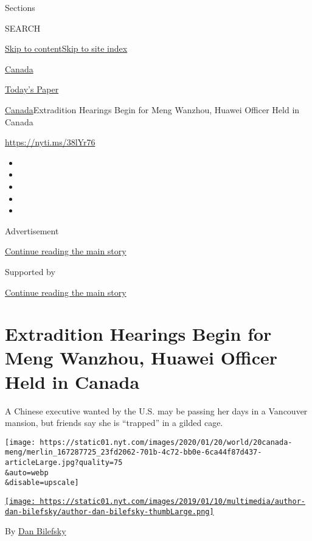 Sections

SEARCH

\protect\hyperlink{site-content}{Skip to
content}\protect\hyperlink{site-index}{Skip to site index}

\href{https://www.nytimes.com/section/world/canada}{Canada}

\href{https://myaccount.nytimes.com/auth/login?response_type=cookie\&client_id=vi}{}

\href{https://www.nytimes.com/section/todayspaper}{Today's Paper}

\href{/section/world/canada}{Canada}\textbar{}Extradition Hearings Begin
for Meng Wanzhou, Huawei Officer Held in Canada

\url{https://nyti.ms/38lYr76}

\begin{itemize}
\item
\item
\item
\item
\item
\end{itemize}

Advertisement

\protect\hyperlink{after-top}{Continue reading the main story}

Supported by

\protect\hyperlink{after-sponsor}{Continue reading the main story}

\hypertarget{extradition-hearings-begin-for-meng-wanzhou-huawei-officer-held-in-canada}{%
\section{Extradition Hearings Begin for Meng Wanzhou, Huawei Officer
Held in
Canada}\label{extradition-hearings-begin-for-meng-wanzhou-huawei-officer-held-in-canada}}

A Chinese executive wanted by the U.S. may be passing her days in a
Vancouver mansion, but friends say she is ``trapped'' in a gilded cage.

\texttt{[image: https://static01.nyt.com/images/2020/01/20/world/20canada-meng/merlin\_167287725\_23fd2062-701b-4c72-bb0e-6ca44f87d437-articleLarge.jpg?quality=75\\\&auto=webp\\\&disable=upscale]}

\href{https://www.nytimes.com/by/dan-bilefsky}{\texttt{[image: https://static01.nyt.com/images/2019/01/10/multimedia/author-dan-bilefsky/author-dan-bilefsky-thumbLarge.png]}}

By \href{https://www.nytimes.com/by/dan-bilefsky}{Dan Bilefsky}

